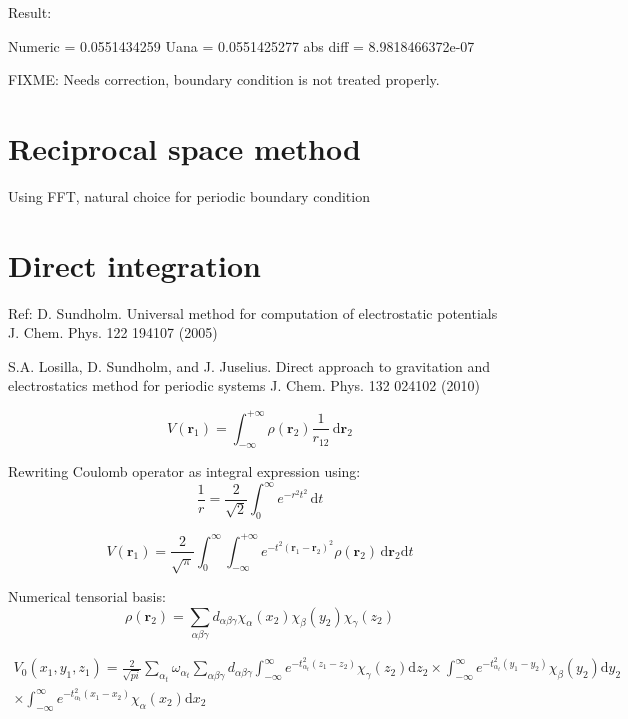 Result:
\begin{textcode}
Numeric  =       0.0551434259
Uana     =       0.0551425277
abs diff =   8.9818466372e-07
\end{textcode}

FIXME: Needs correction, boundary condition is not treated properly.

\section{Reciprocal space method}

Using FFT, natural choice for periodic boundary condition



\section{Direct integration}

Ref:
D. Sundholm.
Universal method for computation of electrostatic potentials
J. Chem. Phys. 122 194107 (2005)

S.A. Losilla, D. Sundholm, and J. Juselius.
Direct approach to gravitation and electrostatics method for periodic systems
J. Chem. Phys. 132 024102 (2010)

\begin{equation}
V(\mathbf{r}_{1}) = \int_{-\infty}^{+\infty}
\rho(\mathbf{r}_{2}) \frac{1}{r_{12}} \, \mathrm{d}\mathbf{r}_{2}
\end{equation}

Rewriting Coulomb operator as integral expression using:
\begin{equation}
\frac{1}{r} = \frac{2}{\sqrt{2}} \int_{0}^{\infty} e^{-r^2 t^2}\,\mathrm{d}t
\end{equation}

\begin{equation}
V(\mathbf{r}_{1}) = \frac{2}{\sqrt{\pi}}
\int_{0}^{\infty}
\int_{-\infty}^{+\infty}
e^{-t^2(\mathbf{r}_1 - \mathbf{r}_2)^2} \rho(\mathbf{r}_2)
\, \mathrm{d}\mathbf{r}_{2}\mathrm{d}t
\end{equation}

Numerical tensorial basis:
\begin{equation}
\rho(\mathbf{r}_2) = \sum_{\alpha\beta\gamma} d_{\alpha\beta\gamma}
\chi_{\alpha}(x_2) \chi_{\beta}(y_2) \chi_{\gamma}(z_2)
\end{equation}

\begin{multline}
V_{0}(x_{1},y_{1},z_{1}) = \frac{2}{\sqrt{pi}}\sum_{\alpha_t} \omega_{\alpha_t}
\sum_{\alpha\beta\gamma} d_{\alpha\beta\gamma}
\int_{-\infty}^{\infty} e^{-t^2_{\alpha_t}(z_{1} - z_{2}) } \chi_{\gamma}(z_2)\mathrm{d}z_2
\times \int_{-\infty}^{\infty} e^{-t^2_{\alpha_t}(y_{1} - y_{2}) } \chi_{\beta}(y_2)\mathrm{d}y_2 \\
\times \int_{-\infty}^{\infty} e^{-t^2_{\alpha_t}(x_{1} - x_{2}) } \chi_{\alpha}(x_2)\mathrm{d}x_2
\end{multline}

